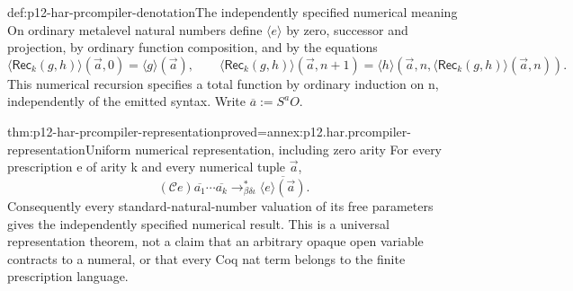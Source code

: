 \begin{hbdefinition}{def:p12-har-prcompiler-denotation}{The independently specified numerical meaning}
On ordinary metalevel natural numbers define \(\langle e\rangle\)
by zero, successor and projection, by ordinary function composition, and
by the equations
\[
 \langle\mathsf{Rec}_k(g,h)\rangle(\vec a,0)=\langle g\rangle(\vec a),
 \qquad
 \langle\mathsf{Rec}_k(g,h)\rangle(\vec a,n+1)
 =\langle h\rangle(\vec a,n,
          \langle\mathsf{Rec}_k(g,h)\rangle(\vec a,n)).
\]
This numerical recursion specifies a total function by ordinary induction
on n, independently of the emitted syntax. Write \(\overline a:=S^aO\).
\end{hbdefinition}

\begin{hbtheorem}{thm:p12-har-prcompiler-representation}{proved=annex:p12.har.prcompiler-representation}{Uniform numerical representation, including zero arity}
For every prescription e of arity k and every numerical tuple \(\vec a\),
\[
 (\mathcal C e)\overline{a_1}\cdots\overline{a_k}
       \longrightarrow_{\beta\delta\iota}^{*}
                         \overline{\langle e\rangle(\vec a)}.
\]
Consequently every standard-natural-number valuation of its free
parameters gives the independently specified numerical result. This is
a universal representation theorem, not a claim that an arbitrary opaque
open variable contracts to a numeral, or that every Coq nat term belongs
to the finite prescription language.
\end{hbtheorem}

